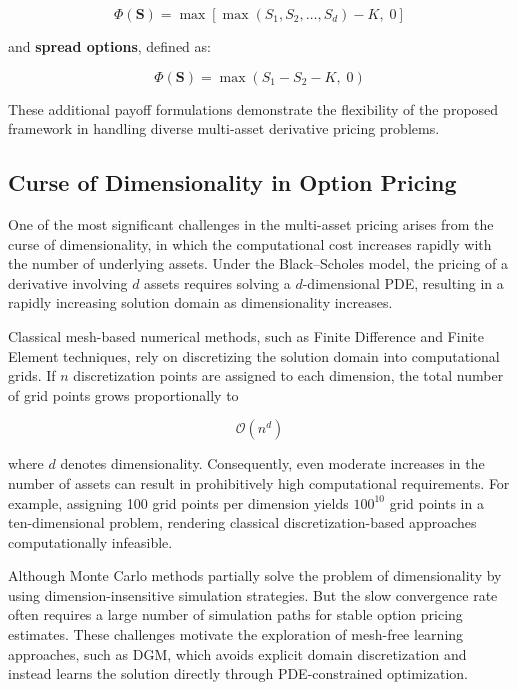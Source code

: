 \documentclass[12pt, a4paper]{article}
\begin{document}
\begin{equation}
    \Phi(\mathbf{S}) = \max\!\left[
        \max(S_1, S_2, \ldots, S_d) - K,\; 0
    \right]
    \label{eq:max_call}
\end{equation}

and \textbf{spread options}, defined as:

\begin{equation}
    \Phi(\mathbf{S}) = \max\!\left(S_1 - S_2 - K,\; 0\right)
    \label{eq:spread}
\end{equation}

These additional payoff formulations demonstrate the flexibility of the
proposed framework in handling diverse multi-asset derivative pricing
problems.

\subsection{Curse of Dimensionality in Option Pricing}

One of the most significant challenges in the multi-asset pricing
arises from the curse of dimensionality, in which the computational
cost increases rapidly with the number of underlying assets. Under the
Black--Scholes model, the pricing of a derivative involving $d$ assets
requires solving a $d$-dimensional PDE, resulting in a rapidly
increasing solution domain as dimensionality increases.

Classical mesh-based numerical methods, such as Finite Difference and
Finite Element techniques, rely on discretizing the solution domain
into computational grids. If $n$ discretization points are assigned to
each dimension, the total number of grid points grows proportionally to

\[
    \mathcal{O}(n^d)
\]

where $d$ denotes dimensionality. Consequently, even moderate increases
in the number of assets can result in prohibitively high computational
requirements. For example, assigning 100 grid points per dimension
yields $100^{10}$ grid points in a ten-dimensional problem, rendering
classical discretization-based approaches computationally infeasible.

Although Monte Carlo methods partially solve the problem of
dimensionality by using dimension-insensitive simulation strategies.
But the slow convergence rate often requires a large number of
simulation paths for stable option pricing estimates. These challenges
motivate the exploration of mesh-free learning approaches, such as DGM,
which avoids explicit domain discretization and instead learns the
solution directly through PDE-constrained optimization.
\end{document}

